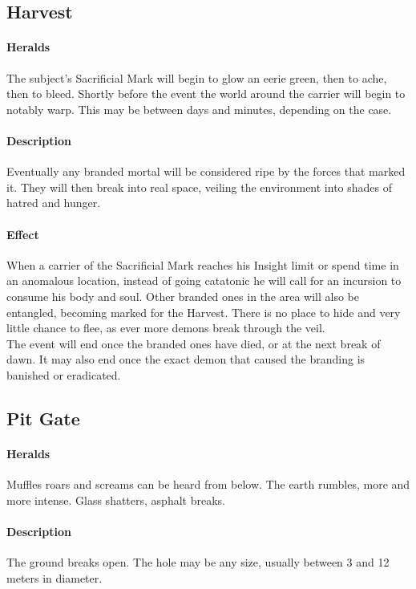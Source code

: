 \subsection*{Harvest}
\label{anomaly:harvest}
\paragraph{Heralds}
The subject's Sacrificial Mark will begin to glow an eerie green,
	then to ache,
	then to bleed.
Shortly before the event the world around the carrier will begin to notably warp.
This may be between days and minutes, depending on the case.
\paragraph{Description}
Eventually any branded mortal will be considered ripe by the forces that marked it.
They will then break into real space,
	veiling the environment into shades of hatred and hunger.
\paragraph{Effect}
When a carrier of the Sacrificial Mark reaches his Insight limit
	or spend time in an anomalous location,
	instead of going catatonic he will call for an incursion to consume his body and soul.
Other branded ones in the area will also be entangled,
	becoming marked for the Harvest.
There is no place to hide
	and very little chance to flee,
	as ever more demons break through the veil.
\\%
The event will end once the branded ones have died,
	or at the next break of dawn.
It may also end once the exact demon that caused the branding is banished or eradicated.
\subsection*{Pit Gate}
\paragraph{Heralds}
Muffles roars and screams can be heard from below.
The earth rumbles, more and more intense.
Glass shatters, asphalt breaks.
\paragraph{Description}
The ground breaks open.
The hole may be any size,
	usually between 3 and 12 meters in diameter.
